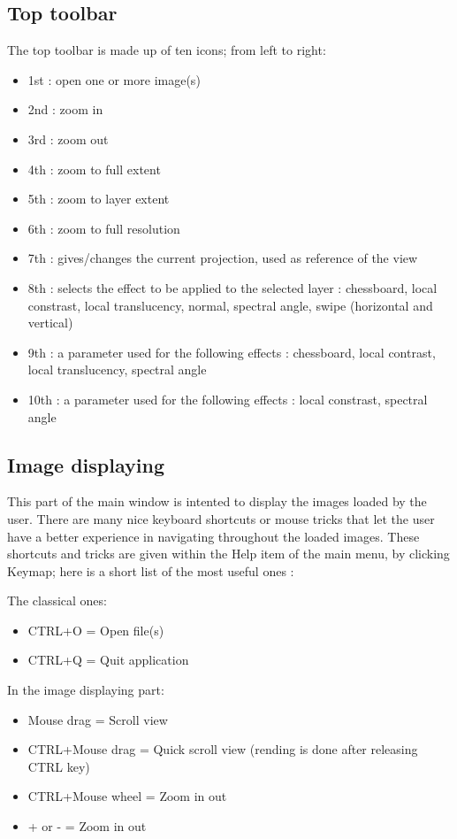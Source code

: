 \subsection{Top toolbar}
The top toolbar is made up of ten icons; from left to right:
\begin{itemize}
\item 1st : open one or more image(s)
\item 2nd : zoom in
\item 3rd : zoom out
\item 4th : zoom to full extent
\item 5th : zoom to layer extent
\item 6th : zoom to full resolution
\item 7th : gives/changes the current projection, used as reference of the view 
\item 8th : selects the effect to be applied to the selected layer : chessboard, local constrast, local translucency, normal, spectral angle, swipe (horizontal and vertical)
\item 9th : a parameter used for the following effects : chessboard, local contrast, local translucency, spectral angle
\item 10th : a parameter used for the following effects :  local constrast, spectral angle
\end{itemize}

\subsection{Image displaying}
This part of the main window is intented to display the images loaded by the user.
There are many nice keyboard shortcuts or mouse tricks that let the user have a better experience in navigating throughout the loaded images.
These shortcuts and tricks are given within the Help item of the main menu, by clicking Keymap; here is a short list of the most useful ones :

The classical ones:
\begin{itemize}
\item CTRL+O = Open file(s)
\item CTRL+Q = Quit application
\end{itemize}

In the image displaying part:
\begin{itemize}
\item Mouse drag = Scroll view
\item CTRL+Mouse drag = Quick scroll view (rending is done after releasing CTRL key)
\item CTRL+Mouse wheel = Zoom in out
\item + or - = Zoom in out
\end{itemize}

